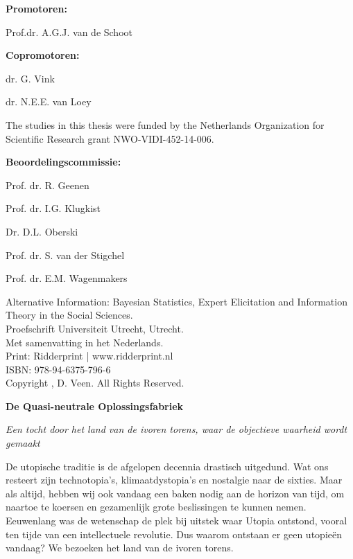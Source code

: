 \documentclass[openright,titlepage,12pt,a4paper]{book}
\begin{document}
\newpage

\pagestyle{empty}
\textbf{Promotoren:}


Prof.dr. A.G.J. van de Schoot

\textbf{Copromotoren:}

dr. G. Vink

dr. N.E.E. van Loey

\vspace*{\fill}

\noindent The studies in this thesis were funded by the Netherlands Organization for Scientific Research grant NWO-VIDI-452-14-006.

% 

\newpage


\textbf{Beoordelingscommissie:}

Prof. dr. R. Geenen

Prof. dr. I.G. Klugkist

Dr. D.L. Oberski 

Prof. dr. S. van der Stigchel

Prof. dr. E.M. Wagenmakers 

\vspace*{\fill}


\noindent Alternative Information: Bayesian Statistics, Expert Elicitation and Information Theory in the Social Sciences.\\
\noindent Proefschrift Universiteit Utrecht, Utrecht. \\
\noindent Met samenvatting in het Nederlands. \\

\noindent Print: Ridderprint | www.ridderprint.nl \\
\noindent ISBN: 978-94-6375-796-6 \\
\noindent Copyright , D. Veen. All Rights Reserved.



\newpage

\textbf{De Quasi-neutrale Oplossingsfabriek}

\textit{Een tocht door het land van de ivoren torens, waar de objectieve waarheid wordt gemaakt}

De utopische traditie is de afgelopen decennia drastisch uitgedund. Wat ons resteert zijn technotopia's, klimaatdystopia's en nostalgie naar de sixties. Maar als altijd, hebben wij ook vandaag een baken nodig aan de horizon van tijd, om naartoe te koersen en gezamenlijk grote beslissingen te kunnen nemen. Eeuwenlang was de wetenschap de plek bij uitstek waar Utopia ontstond, vooral ten tijde van een intellectuele revolutie. Dus waarom ontstaan er geen utopieën vandaag? We bezoeken het land van de ivoren torens.
\end{document}

